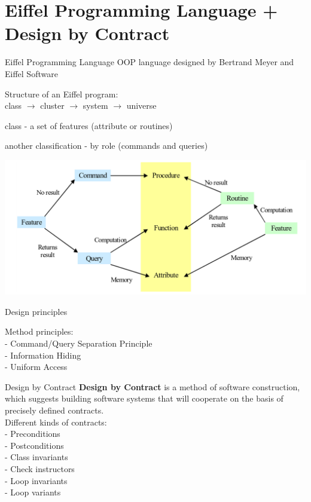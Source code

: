 \documentclass{beamer}
\begin{document}
  \section{Eiffel Programming Language + Design by Contract}

  \begin{frame}{Eiffel Programming Language}
    OOP language designed by Bertrand Meyer and Eiffel Software

    Structure of an Eiffel program:\\
    class $\rightarrow$ cluster $\rightarrow$ system $\rightarrow$ universe

    class - a set of features (attribute or routines)

    another classification - by role (commands and queries)

    \centering
    \includegraphics[width=0.8\linewidth]{eiffel_features}
    
  \end{frame}

  \begin{frame}{Design principles}

    Method principles:\\
    - Command/Query Separation Principle\\
    - Information Hiding\\
    - Uniform Access\\

  \end{frame}

  \begin{frame}{Design by Contract}
    \textbf{Design by Contract}
    is a method of software construction,
    which suggests building software
    systems that will cooperate on the basis
    of precisely defined contracts.\\[2em]

      Different kinds of contracts:\\
      - Preconditions\\
      - Postconditions\\
      - Class invariants\\
      - Check instructors\\
      - Loop invariants\\
      - Loop variants\\

  \end{frame}
\end{document}
